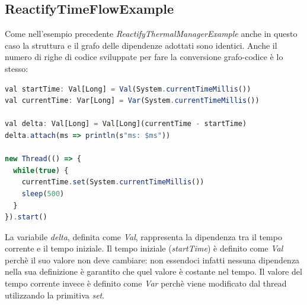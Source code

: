 \documentclass[../main.tex]{subfiles}
\begin{document}
\subsection{ReactifyTimeFlowExample}
Come nell'esempio precedente \textit{ReactifyThermalManagerExample} anche in questo caso la struttura e il grafo delle dipendenze adottati sono identici. Anche il numero di righe di codice sviluppate per fare la conversione grafo-codice è lo stesso:
\begin{lstlisting}[language=Javascript, caption=Reactify - Esempio completo]
val startTime: Val[Long] = Val(System.currentTimeMillis())
val currentTime: Var[Long] = Var(System.currentTimeMillis())

val delta: Val[Long] = Val[Long](currentTime - startTime)
delta.attach(ms => println(s"ms: $ms"))

new Thread(() => {
  while(true) {
    currentTime.set(System.currentTimeMillis())
    sleep(500)
  }
}).start()
\end{lstlisting}
La variabile \textit{delta}, definita come \textit{Val}, rappresenta la dipendenza tra il tempo corrente e il tempo iniziale. Il tempo iniziale (\textit{startTime}) è definito come \textit{Val} perchè il suo valore non deve cambiare: non essendoci infatti nessuna dipendenza nella sua definizione è garantito che quel valore è costante nel tempo. Il valore del tempo corrente invece è definito come \textit{Var} perchè viene modificato dal thread utilizzando la primitiva \textit{set}.
\end{document}
